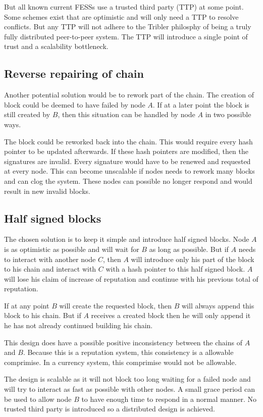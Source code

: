 But all known current FESSs use a trusted third party (TTP) at some point\cite{asokan-fairexchange}.
Some schemes exist that are optimistic and will only need a TTP to resolve conflicts.
But any TTP will not adhere to the Tribler philosphy 
of being a truly fully distributed peer-to-peer system.
The TTP will introduce a single point of trust and a scalability bottleneck.

\subsection{Reverse repairing of chain}
Another potential solution would be to rework part of the chain.
The creation of block could be deemed to have failed by node $A$.
If at a later point the block is still created by $B$,
then this situation can be handled by node $A$ in two possible ways.

The block could be reworked back into the chain.
This would require every hash pointer to be updated afterwards.
If these hash pointers are modified, then the signatures are invalid.
Every signature would have to be renewed and requested at every node.
This can become unscalable if nodes needs to rework many blocks and can clog the system.
These nodes can possible no longer respond and would result in new invalid blocks.

\subsection{Half signed blocks}
The chosen solution is to keep it simple and introduce half signed blocks.
Node $A$ is as optimistic as possible and will wait for $B$ as long as possible.
But if $A$ needs to interact with another node $C$, 
then $A$ will introduce only his part of the block to his chain 
and interact with $C$ with a hash pointer to this half signed block.
$A$ will lose his claim of increase of reputation and continue with his previous total of reputation.

If at any point $B$ will create the requested block, 
then $B$ will always append this block to his chain. 
But if $A$ receives a created block 
then he will only append it he has not already continued building his chain.

This design does have a possible positive inconsistency between the chains of $A$ and $B$.
Because this is a reputation system, this consistency is a allowable comprimise.
In a currency system, this comprimise would not be allowable.

The design is scalable as it will not block too long waiting for a failed node 
and will try to interact as fast as possible with other nodes.
A small grace period can be used to allow node $B$ to have enough time to respond in a normal manner.
No trusted third party is introduced so a distributed design is achieved.

